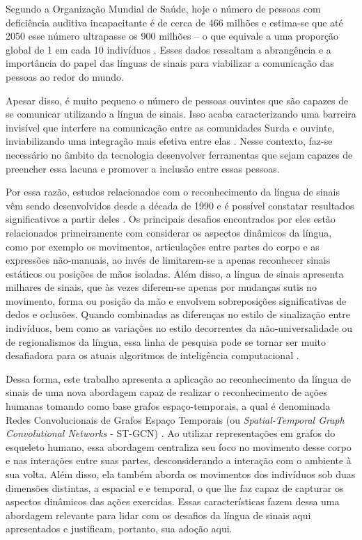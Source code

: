 Segundo a Organização Mundial de Saúde, hoje o número de pessoas com deficiência auditiva incapacitante é de cerca de 466 milhões e estima-se que até 2050 esse número ultrapasse os 900 milhões -- o que equivale a uma proporção global de 1 em cada 10 indivíduos \cite{who-2018}. Esses dados ressaltam a abrangência e a importância do papel das línguas de sinais para viabilizar a comunicação das pessoas ao redor do mundo. 

Apesar disso, é muito pequeno o número de pessoas ouvintes que são capazes de se comunicar utilizando a língua de sinais. Isso acaba caracterizando uma barreira invisível que interfere na comunicação entre as comunidades Surda e ouvinte, inviabilizando uma integração mais efetiva entre elas \cite{peres-2006}. Nesse contexto, faz-se necessário no âmbito da tecnologia desenvolver ferramentas que sejam capazes de preencher essa lacuna e promover a inclusão entre essas pessoas. 

Por essa razão, estudos relacionados com o reconhecimento da língua de sinais vêm sendo desenvolvidos desde a década de 1990 e é possível constatar resultados significativos a partir deles \cite{lim-2016, recent-advances-dl-2017}. Os principais desafios encontrados por eles estão relacionados primeiramente com considerar os aspectos dinâmicos da língua, como por exemplo os movimentos, articulações entre partes do corpo e as expressões não-manuais, ao invés de limitarem-se a apenas reconhecer sinais estáticos ou posições de mãos isoladas. Além disso, a língua de sinais apresenta milhares de sinais, que às vezes diferem-se apenas por mudanças sutis no movimento, forma ou posição da mão e envolvem sobreposições significativas de dedos e oclusões. Quando combinadas as diferenças no estilo de sinalização entre indivíduos, bem como as variações no estilo decorrentes da não-universalidade ou de regionalismos da língua, essa linha de pesquisa pode se tornar ser muito desafiadora para os atuais algoritmos de inteligência computacional \cite{konstantinidis-2018}.

Dessa forma, este trabalho apresenta a aplicação ao reconhecimento da língua de sinais de uma nova abordagem capaz de realizar o reconhecimento de ações humanas tomando como base grafos espaço-temporais, a qual é denominada Redes Convolucionais de Grafos Espaço Temporais (ou \textit{Spatial-Temporal Graph Convolutional Networks} - ST-GCN) \cite{st-gcn-2018}.
Ao utilizar representações em grafos do esqueleto humano, essa abordagem centraliza seu foco no movimento desse corpo e nas interações entre suas partes, desconsiderando a interação com o ambiente à sua volta. Além disso, ela também aborda os movimentos dos indivíduos sob duas dimensões distintas, a espacial e e temporal, o que lhe faz capaz de capturar os aspectos dinâmicos das ações exercidas. Essas características fazem dessa uma abordagem relevante para lidar com os desafios da língua de sinais aqui apresentados e justificam, portanto, sua adoção aqui.

